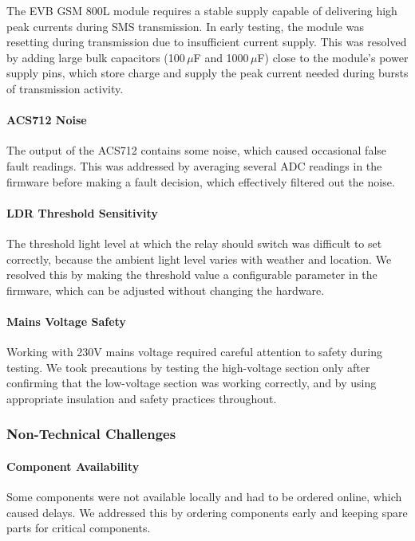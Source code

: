 \documentclass{article}
\begin{document}
The EVB GSM 800L module requires a stable supply capable of delivering high peak currents during SMS transmission. In early testing, the module was resetting during transmission due to insufficient current supply. This was resolved by adding large bulk capacitors (100\,$\mu$F and 1000\,$\mu$F) close to the module's power supply pins, which store charge and supply the peak current needed during bursts of transmission activity.

\paragraph{ACS712 Noise}

The output of the ACS712 contains some noise, which caused occasional false fault readings. This was addressed by averaging several ADC readings in the firmware before making a fault decision, which effectively filtered out the noise.

\paragraph{LDR Threshold Sensitivity}

The threshold light level at which the relay should switch was difficult to set correctly, because the ambient light level varies with weather and location. We resolved this by making the threshold value a configurable parameter in the firmware, which can be adjusted without changing the hardware.

\paragraph{Mains Voltage Safety}

Working with 230V mains voltage required careful attention to safety during testing. We took precautions by testing the high-voltage section only after confirming that the low-voltage section was working correctly, and by using appropriate insulation and safety practices throughout.

\subsubsection{Non-Technical Challenges}

\paragraph{Component Availability}

Some components were not available locally and had to be ordered online, which caused delays. We addressed this by ordering components early and keeping spare parts for critical components.
\end{document}
